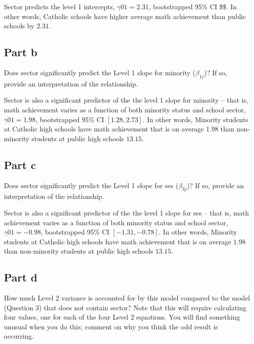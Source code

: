 \documentclass[]{article}
\begin{document}
Sector predicts the level 1 intercepts, \(\gamma01 = 2.31\),
bootstrapped 95\% CI \$\$. In other words, Catholic schools have higher
average math achievement than public schools by \(2.31\).

\subsection{Part b}\label{part-b-2}

Does sector significantly predict the Level 1 slope for minority
(\(\beta_{1j}\))? If so, provide an interpretation of the relationship.

Sector is also a significant predictor of the the level 1 slope for
minority -- that is, math achievement varies as a function of both
minority status and school sector, \(\gamma01 = 1.98\), bootstrapped
95\% CI \([1.28, 2.73]\). In other words, Minority students at Catholic
high schools have math achievement that is on average \(1.98\) than
non-minority students at public high schools \(13.15\).

\subsection{Part c}\label{part-c-2}

Does sector significantly predict the Level 1 slope for ses
(\(\beta_{3j}\))? If so, provide an interpretation of the relationship.

Sector is also a significant predictor of the the level 1 slope for ses
-- that is, math achievement varies as a function of both minority
status and school sector, \(\gamma01 = -0.98\), bootstrapped 95\% CI
\([-1.31, -0.78]\). In other words, Minority students at Catholic high
schools have math achievement that is on average \(1.98\) than
non-minority students at public high schools \(13.15\).

\subsection{Part d}\label{part-d-2}

How much Level 2 variance is accounted for by this model compared to the
model (Question 3) that does not contain sector? Note that this will
require calculating four values, one for each of the four Level 2
equations. You will find something unusual when you do this; comment on
why you think the odd result is occurring.
\end{document}

